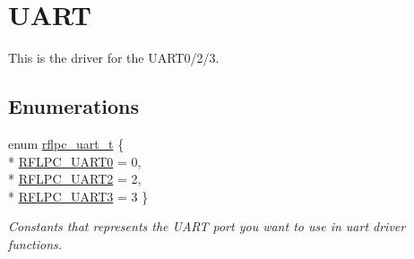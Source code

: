 \hypertarget{group__uart}{\section{U\-A\-R\-T}
\label{group__uart}
}


This is the driver for the U\-A\-R\-T0/2/3.  


\subsection*{Enumerations}
\begin{DoxyCompactItemize}
\item 
enum \hyperlink{group__uart_gab5996edf55ac7654ec4040e6aedaa7ca}{rflpc\-\_\-uart\-\_\-t} \{ \\*
\hyperlink{group__uart_ggab5996edf55ac7654ec4040e6aedaa7caa7203ffec58658c5e01ace4b2b7f22678}{R\-F\-L\-P\-C\-\_\-\-U\-A\-R\-T0} =  0, 
\\*
\hyperlink{group__uart_ggab5996edf55ac7654ec4040e6aedaa7caaa7f5b040eb95433e2ef8c7810a6f1906}{R\-F\-L\-P\-C\-\_\-\-U\-A\-R\-T2} =  2, 
\\*
\hyperlink{group__uart_ggab5996edf55ac7654ec4040e6aedaa7caa644eb34704020acd151df073f0040917}{R\-F\-L\-P\-C\-\_\-\-U\-A\-R\-T3} =  3
 \}
\begin{DoxyCompactList}\small\item\em Constants that represents the U\-A\-R\-T port you want to use in uart driver functions. \end{DoxyCompactList}\end{DoxyCompactItemize}
